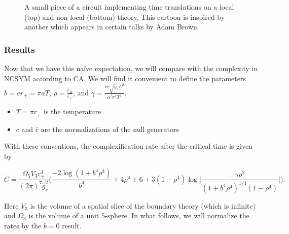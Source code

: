 \documentclass[8pt,aspectratio=169]{beamer}
\begin{document}
\begin{frame}
\begin{minipage}[t]{0.48\linewidth}
\begin{figure}
\begin{center}
    \end{center}
    \caption{A small piece of a circuit implementing time translations on a local (top) and non-local (bottom) theory. This cartoon is inspired by another which appears in certain talks by Adam Brown.}
\end{figure}

\end{minipage}

\end{frame}


\begin{frame}
\frametitle{Results}

Now that we have this na\"ive expectation, we will compare with the complexity in NCSYM according to CA. We will find it convenient to define the parameters $b = a r_+ = \pi a T$,  $\rho = \frac{r_B}{r_+}$, and  $\gamma = \frac{c \bar{c} \sqrt{\bar{g}_s} L^2}{\alpha' \pi^2 T^2}$.
\begin{itemize}

\item $T=\pi r_+$ is the temperature

\item $c$ and $\bar{c}$ are the normalizations of the null generators

\end{itemize}

With these conventions, the complexification rate after the critical time is given by

\begin{equation}
\dot{C} = \frac{\Omega_5 V_3 r_+^4}{(2\pi)^7 \hat{g}_s^2}
\bigg(\frac{-2\log(1+b^4 \rho^4)}{b^4}+4\rho^4+6+3(1-\rho^4)\log\big|\frac{\gamma \rho^2}{(1+b^4 \rho^4)^{1/4}(1-\rho^4)}\big|\bigg).
\end{equation}

Here $V_3$ is the volume of a spatial slice of the boundary theory (which is infinite) and $\Omega_3$ is the volume of a unit 5-sphere. In what follows, we will normalize the rates by the $b=0$ result. 

\end{frame}
\end{document}
